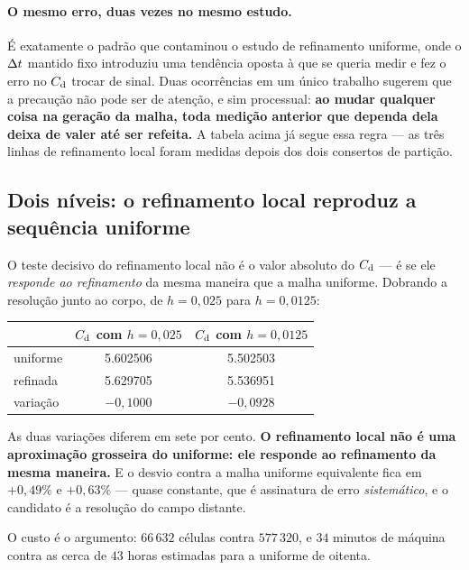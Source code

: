 \paragraph{O mesmo erro, duas vezes no mesmo estudo.} É exatamente o padrão que
contaminou o estudo de refinamento uniforme, onde o $\Delta t$ mantido fixo
introduziu uma tendência oposta à que se queria medir e fez o erro no $C_{\mathrm{d}}$
trocar de sinal. Duas ocorrências em um único trabalho sugerem que a precaução
não pode ser de atenção, e sim processual: \textbf{ao mudar qualquer coisa na
geração da malha, toda medição anterior que dependa dela deixa de valer até ser
refeita.} A tabela acima já segue essa regra --- as três linhas de refinamento
local foram medidas depois dos dois consertos de partição.

\subsection{Dois níveis: o refinamento local reproduz a sequência uniforme}

O teste decisivo do refinamento local não é o valor absoluto do $C_{\mathrm{d}}$ --- é se
ele \emph{responde ao refinamento} da mesma maneira que a malha uniforme.
Dobrando a resolução junto ao corpo, de $h=0{,}025$ para $h=0{,}0125$:

\begin{center}
\begin{tabular}{lSS}
  \toprule
  & {$C_{\mathrm{d}}$ com $h=0{,}025$} & {$C_{\mathrm{d}}$ com $h=0{,}0125$} \\
  \midrule
  uniforme & 5.602506 & 5.502503 \\
  refinada & 5.629705 & 5.536951 \\
  \midrule
  variação & {$-0{,}1000$} & {$-0{,}0928$} \\
  \bottomrule
\end{tabular}
\end{center}

As duas variações diferem em sete por cento. \textbf{O refinamento local não é
uma aproximação grosseira do uniforme: ele responde ao refinamento da mesma
maneira.} E o desvio contra a malha uniforme equivalente fica em $+0{,}49\%$ e
$+0{,}63\%$ --- quase constante, que é assinatura de erro \emph{sistemático}, e
o candidato é a resolução do campo distante.

O custo é o argumento: $66\,632$ células contra $577\,320$, e $34$ minutos de
máquina contra as cerca de $43$ horas estimadas para a uniforme de oitenta.

